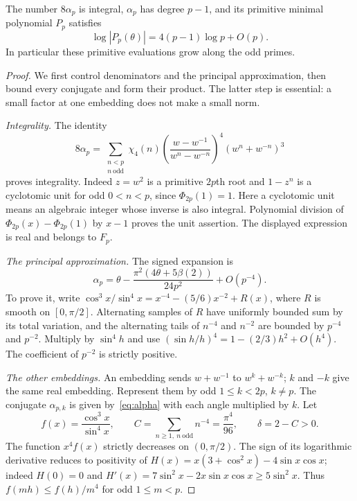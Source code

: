 \begin{theorem}\label{thm:norm}
The number $8\alpha_p$ is integral, $\alpha_p$ has degree $p-1$,
and its primitive minimal polynomial $P_p$ satisfies
\[
 \log|P_p(\theta)|=4(p-1)\log p+O(p).
\]
In particular these primitive evaluations grow along the odd primes.
\end{theorem}
\begin{proof}
We first control denominators and the principal approximation, then
bound every conjugate and form their product. The latter step is
essential: a small factor at one embedding does not make a small norm.

\emph{Integrality.}
The identity
\[
 8\alpha_p=\sum_{\substack{n<p\\n\ \text{odd}}}\chi_4(n)
 \left(\frac{w-w^{-1}}{w^n-w^{-n}}\right)^4(w^n+w^{-n})^3
\]
proves integrality. Indeed $z=w^2$ is a primitive $2p$th root and
$1-z^n$ is a cyclotomic unit for odd $0<n<p$, since
$\Phi_{2p}(1)=1$. Here a cyclotomic unit means an algebraic integer
whose inverse is also integral. Polynomial division of
$\Phi_{2p}(x)-\Phi_{2p}(1)$ by $x-1$ proves the unit assertion.
The displayed expression is real and belongs to $F_p$.

\emph{The principal approximation.} The signed expansion is
\begin{equation}\label{eq:alpha-error}
 \alpha_p=\theta-
 \frac{\pi^2(4\theta+5\beta(2))}{24p^2}+O(p^{-4}).
\end{equation}
To prove it, write
$\cos^3x/\sin^4x=x^{-4}-(5/6)x^{-2}+R(x)$, where $R$ is smooth
on $[0,\pi/2]$. Alternating samples of $R$ have uniformly bounded
sum by its total variation, and the alternating tails of $n^{-4}$
and $n^{-2}$ are bounded by $p^{-4}$ and $p^{-2}$. Multiply by
$\sin^4h$ and use $(\sin h/h)^4=1-(2/3)h^2+O(h^4)$.
The coefficient of $p^{-2}$ is strictly positive.

\emph{The other embeddings.} An embedding sends $w+w^{-1}$ to
$w^k+w^{-k}$; $k$ and $-k$ give the same real embedding.
Represent them by odd $1\leq k<2p$, $k\ne p$.
The conjugate $\alpha_{p,k}$ is given by~\eqref{eq:alpha} with each
angle multiplied by $k$. Let
\[
 f(x)=\frac{\cos^3x}{\sin^4x},\qquad
 C=\sum_{n\geq1,\ n\ \text{odd}}n^{-4}=\frac{\pi^4}{96},
 \qquad\delta=2-C>0.
\]
The function $x^4f(x)$ strictly decreases on $(0,\pi/2)$.
The sign of its logarithmic derivative reduces to positivity of
$H(x)=x(3+\cos^2x)-4\sin x\cos x$; indeed $H(0)=0$ and
$H'(x)=7\sin^2x-2x\sin x\cos x\geq5\sin^2x$.
Thus $f(mh)\leq f(h)/m^4$ for odd $1\leq m<p$.


\end{proof}

